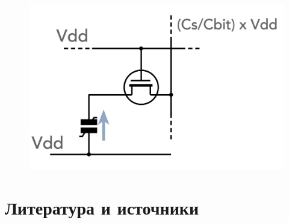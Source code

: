 \documentclass[a4paper]{article}
\begin{document}
\begin{figure}[H]
\begin{center}
\hfill 
\begin{minipage}[h]{0.32\linewidth}
\includegraphics[width=1.5\linewidth]{p13.png}
\caption{}
\label{p13}
\end{minipage}
\end{center}
\end{figure}


\section{Литература и источники}
\end{document}
